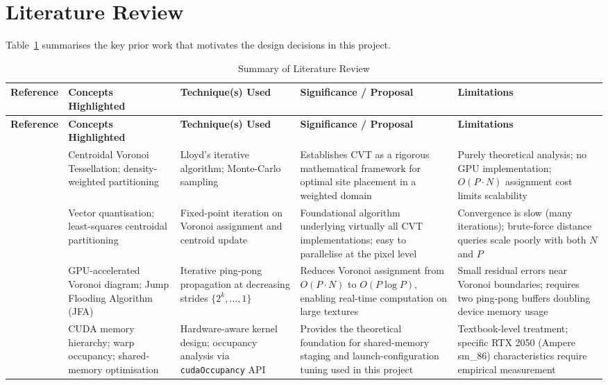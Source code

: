\documentclass[12pt,a4paper]{article}
\begin{document}
\section{Literature Review}

Table~\ref{tab:litreview} summarises the key prior work that motivates the
design decisions in this project.

\begin{longtable}{|p{2.5cm}|p{3.0cm}|p{3.0cm}|p{3.3cm}|p{3.3cm}|}
\caption{Summary of Literature Review}
\label{tab:litreview}\\
\hline
\textbf{Reference} &
\textbf{Concepts Highlighted} &
\textbf{Technique(s) Used} &
\textbf{Significance / Proposal} &
\textbf{Limitations} \\
\hline
\endfirsthead
\hline
\textbf{Reference} &
\textbf{Concepts Highlighted} &
\textbf{Technique(s) Used} &
\textbf{Significance / Proposal} &
\textbf{Limitations} \\
\hline
\endhead

\cite{du1999centroidal} &
Centroidal Voronoi Tessellation; density-weighted partitioning &
Lloyd's iterative algorithm;
Monte-Carlo sampling &
Establishes CVT as a rigorous mathematical framework for optimal
site placement in a weighted domain &
Purely theoretical analysis; no GPU implementation; $O(P \cdot N)$
assignment cost limits scalability \\
\hline

\cite{lloyd1982least} &
Vector quantisation; least-squares centroidal partitioning &
Fixed-point iteration on Voronoi assignment and centroid update &
Foundational algorithm underlying virtually all CVT implementations;
easy to parallelise at the pixel level &
Convergence is slow (many iterations); brute-force distance queries
scale poorly with both $N$ and $P$ \\
\hline

\cite{rong2006jump} &
GPU-accelerated Voronoi diagram; Jump Flooding Algorithm (JFA) &
Iterative ping-pong propagation at decreasing strides $\{2^{k},\dots,1\}$ &
Reduces Voronoi assignment from $O(P \cdot N)$ to $O(P \log P)$,
enabling real-time computation on large textures &
Small residual errors near Voronoi boundaries; requires two
ping-pong buffers doubling device memory usage \\
\hline

\cite{kirk2022programming} &
CUDA memory hierarchy; warp occupancy; shared-memory optimisation &
Hardware-aware kernel design; occupancy analysis via \texttt{cudaOccupancy} API &
Provides the theoretical foundation for shared-memory staging and
launch-configuration tuning used in this project &
Textbook-level treatment; specific RTX 2050 (Ampere sm\_86)
characteristics require empirical measurement \\
\hline


\end{longtable}
\end{document}
